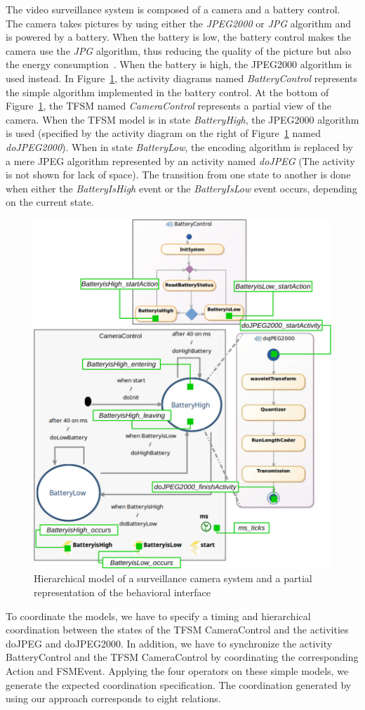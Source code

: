 	The video surveillance system is composed of a camera and a battery control. The camera takes pictures by using either the \emph{JPEG2000} or \emph{JPG} algorithm and is powered by a battery. When the battery is low, the battery control makes the camera use the \emph{JPG} algorithm, thus reducing the quality of the picture but also the energy consumption~\cite{encodingcomparison}. When the battery is high, the JPEG2000 algorithm is used instead. In Figure~\ref{fig:camerasystem}, the activity diagrams named \emph{BatteryControl} represents the simple algorithm implemented in the battery control. At the bottom of Figure~\ref{fig:camerasystem}, the TFSM named \emph{CameraControl} represents a partial view of the camera. When the TFSM model is in state \emph{BatteryHigh}, the JPEG2000 algorithm is used (specified by the activity diagram on the right of Figure~\ref{fig:camerasystem} named \emph{doJPEG2000}). When in state \emph{BatteryLow}, the encoding algorithm is replaced by a mere JPEG algorithm represented by an activity named \emph{doJPEG} (The activity is not shown for lack of space). The transition from one state to another is done when either the \emph{BatteryIsHigh} event or the \emph{BatteryIsLow} event occurs, depending on the current state.	 
	
	\begin{figure}
		\center
		\includegraphics[width=.6\columnwidth]{examples/figs/picmodels.pdf}
		\caption{Hierarchical model of a surveillance camera system and a partial representation of the behavioral interface}
		\label{fig:camerasystem}
	\end{figure}
	
	To coordinate the models, we have to specify a timing and hierarchical coordination between the states of the TFSM CameraControl and the activities doJPEG and doJPEG2000. In addition, we have to synchronize the activity BatteryControl and the TFSM CameraControl by coordinating the corresponding Action and FSMEvent. Applying the four operators on these simple models, we generate the expected coordination specification. The coordination generated by using our approach corresponds to eight \ccsl relations.
	 
